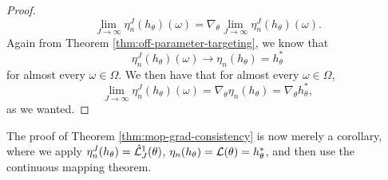 \begin{proof}
\begin{equation}
    \lim_{J \to \infty} \eta_n^J(h_\theta)(\omega) = \nabla_\theta \lim_{J \to \infty} \eta_n^J(h_\theta)(\omega).
    \end{equation}
Again from Theorem \ref{thm:off-parameter-targeting}, we know that
    \begin{equation}\eta_n^J(h_\theta)(\omega) \to \eta_n(h_\theta) = h^*_\theta\end{equation} for almost every $\omega\in\Omega$.
    We then have that for almost every $\omega \in \Omega$, 
    \begin{equation}
    \lim_{J \to \infty} \eta_n^J(h_\theta)(\omega) = \nabla_\theta \eta_n(h_\theta) = \nabla_\theta h^*_\theta,
    \end{equation}
    as we wanted. 
    \end{proof}
The proof of Theorem \ref{thm:mop-grad-consistency} is now merely a corollary, where we apply $\eta_n^J (h_\theta) = \hat{\mathcal{L}}^1_J(\theta)$, $\eta_n(h_\theta) = \mathcal{L}(\theta) = h_\theta^*$, and then use the continuous mapping theorem. 





